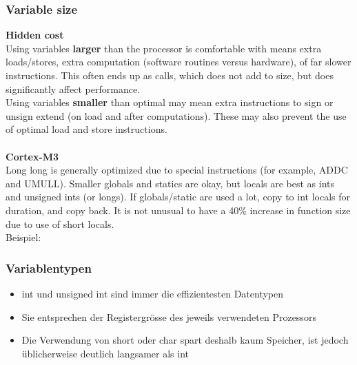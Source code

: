 \subsubsection{Variable size}
\textbf{Hidden cost}\\
Using variables \textbf{larger} than the processor is comfortable with means extra loads/stores, extra computation (software routines versus hardware), of far slower instructions. This often ends up as calls, which does not add to size, but does significantly affect performance.\\
Using variables \textbf{smaller} than optimal may mean extra instructions to sign or unsign extend (on load and after computations). These may also prevent the use of optimal load and store instructions.\\
\\
\textbf{Cortex-M3}\\
Long long is generally optimized due to special instructions (for example, ADDC and UMULL). Smaller globals and statics are okay, but locals are best as ints and unsigned ints (or longs). If globals/static are used a lot, copy to int locals for duration, and copy back. It is not unusual to have a 40\% increase in function size due to use of short locals.\\
Beispiel:\vspace{-\baselineskip}
\begin{multicols}{2}

\vfill\null
\columnbreak

\end{multicols}

\subsubsection{Variablentypen}
\begin{itemize}
	\item int und unsigned int sind immer die effizientesten Datentypen
	\item Sie entsprechen der Registergrösse des jeweils verwendeten Prozessors
	\item Die Verwendung von short oder char spart deshalb kaum Speicher, ist jedoch üblicherweise deutlich langsamer als int
\end{itemize}

